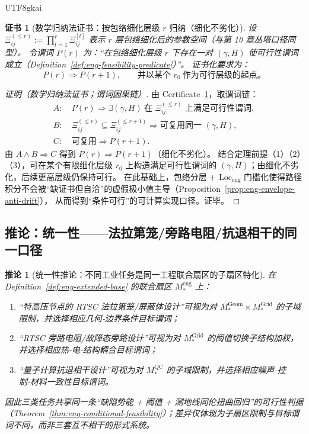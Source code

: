 \documentclass[12pt]{article}
\newtheorem{corollary}{推论}[section]
\newtheorem{certificate}{证书}[section]
\newcommand{\RTSC}{\textsf{RTSC}}
\begin{document}
\begin{CJK*}{UTF8}{gkai}
\begin{certificate}[数学归纳法证书：按包络细化层级 $r$ 归纳（细化不劣化）]
\label{cert:eng-envelope-refine-induction}
设 $\Xi_{ij}^{(\le r)}:=\prod_{t=1}^{r}\Xi_{ij}^{[t]}$ 表示 $r$ 层包络细化后的参数空间（与第 10 章丛塔口径同型）。
令谓词 $P(r)$ 为：“在包络细化层级 $r$ 下存在一对 $(\gamma,H)$ 使可行性谓词成立（Definition~\ref{def:eng-feasibility-predicate}）”。
证书化要求为：
\[
P(r)\Rightarrow P(r+1),
\qquad
\text{并以某个 }r_0\ \text{作为可行层级的起点。}
\]
\end{certificate}

\begin{proof}[证明（数学归纳法证书；谓词因果链）]
由 Certificate~\ref{cert:eng-envelope-refine-induction}，取谓词链：
\[
\begin{aligned}
A:&\ P(r)\Rightarrow \exists (\gamma,H)\ \text{在 }\Xi_{ij}^{(\le r)}\text{ 上满足可行性谓词},\\
B:&\ \Xi_{ij}^{(\le r)}\subseteq \Xi_{ij}^{(\le r+1)}\Rightarrow \text{可复用同一 }(\gamma,H),\\
C:&\ \text{可复用}\Rightarrow P(r+1).
\end{aligned}
\]
由 $A\wedge B\Rightarrow C$ 得到 $P(r)\Rightarrow P(r+1)$（细化不劣化）。
结合定理前提（1）（2）（3），可在某个有限细化层级 $r_0$ 上构造满足可行性谓词的 $(\gamma,H)$；由细化不劣化，后续更高层级仍保持可行。
在此基础上，包络分层 + $\mathrm{Loc}_{\mathrm{eng}}$ 门槛化使得路径积分不会被“缺证书但自洽”的虚假极小值主导（Proposition~\ref{prop:eng-envelope-anti-drift}），
  从而得到“条件可行”的可计算实现口径。证毕。
\end{proof}

\subsection{推论：统一性——法拉第笼/旁路电阻/抗退相干的同一口径}

\begin{corollary}[统一性推论：不同工业任务是同一工程联合扇区的子扇区特化]
\label{cor:eng-unified-subsectors}
在 Definition~\ref{def:eng-extended-base} 的联合扇区 $M_\ast^{\mathrm{eng}}$ 上：
\begin{enumerate}
  \item “特高压节点的 \RTSC{} 法拉第笼/屏蔽体设计”可视为对 $M_\ast^{\mathrm{Geom}}\times M_\ast^{\mathrm{Grid}}$ 的子域限制，并选择相应几何‑边界条件目标谓词；
  \item “\RTSC{} 旁路电阻/故障态旁路设计”可视为对 $M_\ast^{\mathrm{Grid}}$ 的阈值切换子结构加权，并选择相应热‑电‑结构耦合目标谓词；
  \item “量子计算抗退相干设计”可视为对 $M_\ast^{\mathrm{QC}}$ 的子域限制，并选择相应噪声‑控制‑材料一致性目标谓词。
\end{enumerate}
因此三类任务共享同一条“缺陷势能 + 阈值 + 测地线同伦扭曲回归”的可行性判据（Theorem~\ref{thm:eng-conditional-feasibility}）；差异仅体现为子扇区限制与目标谓词不同，而非三套互不相干的形式系统。


\end{corollary}
\end{CJK*}
\end{document}

